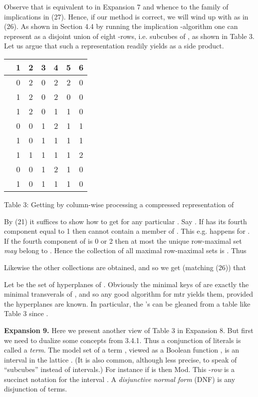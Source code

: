 \documentclass[11pt]{article}
\begin{document}
Observe that  is equivalent to  in Expansion 7 and whence to the family of implications in (27). Hence, if our method is correct, we will wind up with  as in (26). As shown in
Section 4.4 by running the implication -algorithm one can represent  as a disjoint union of eight -rows, i.e. subcubes of , as shown in Table 3. Let us argue that such a representation readily yields  as a side product. 

\begin{tabular}{c|c|c|c|c|c|c|} 
& 1 & 2& 3& 4& 5& 6 \\ \hline
 & 0 & 2& 0 &2 & 2& 0 \\ \hline
 & 1 &2 & 0 & 2 & 0 & 0 \\ \hline
 & 1 & 2& 0 & 1& 1& 0 \\ \hline
 & 0 & 0 & 1 & 2 & 1 & 1 \\ \hline
 & 1 & 0 & 1 & 1 & 1 &1 \\ \hline
 & 1 & 1 & 1& 1 & 1& 2 \\ \hline
 & 0 & 0 & 1 & 2& 1& 0 \\ \hline
 & 1 & 0 & 1 & 1 & 1 &0 \\ \hline \end{tabular}

Table 3: Getting  by column-wise processing a compressed representation of 

By (21) it suffices to show how to get  for any particular . Say .  If  has its fourth component equal to 1 then  cannot contain a member of . This e.g. happens for . If the fourth component of  is 0 or 2 then at most the unique row-maximal set  {\it may} belong to . Hence the collection of all maximal row-maximal sets is . Thus


Likewise the other collections  are obtained, and so we get (matching (26)) that 


Let  be the set of hyperplanes of . Obviously the minimal keys of  are exactly the minimal transverals of , and so any good algorithm for mtr yields them, provided the hyperplanes are known. In particular, the 's can be gleaned from a table like Table 3 since .


{\bf Expansion 9.} Here we present another view of Table 3 in Expansion 8. But first we need to dualize some concepts from 3.4.1. 
Thus a conjunction of literals is called a {\it term}. The model set of a term , viewed as a Boolean function , is an interval in the lattice . (It is also common, although less precise, to speak of ``subcubes'' instead of intervals.) For instance if  is  then Mod. This -{\it row} is a succinct notation for the interval  .  A {\it disjunctive normal form} (DNF) is any disjunction of terms. 
\end{document}
